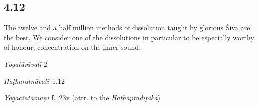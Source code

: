 \begin{ekdosis}




\subsection*{4.12}
\begin{translation}[hp04_012]
The twelve and a half million methods of dissolution taught by glorious Śiva are the best. We consider one of the dissolutions in particular to be especially worthy of honour, concentration on the inner sound.
\end{translation}

\begin{sources}[hp04_012]
\emph{Yogatārāvalī} 2
\begin{versinnote}
\end{versinnote}
\end{sources}

\begin{testimonia}[hp04_012]
\emph{Haṭharatnāvalī}~1.12
\begin{versinnote}
\end{versinnote}

\emph{Yogacintāmaṇi} f.~23v (attr. to the \emph{Haṭhapradīpikā})
\begin{versinnote}
\end{versinnote}


\end{testimonia}
\end{ekdosis}
